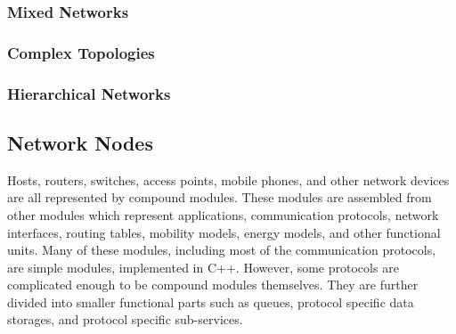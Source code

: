 
\subsubsection*{Mixed Networks}


\subsubsection*{Complex Topologies}


\subsubsection*{Hierarchical Networks}


\subsection{Network Nodes}
\label{subsec:network-nodes}



Hosts, routers, switches, access points, mobile phones, and other network devices are all represented by \omnet compound modules. These modules are assembled from other modules which represent applications, communication protocols, network interfaces, routing tables, mobility models, energy models, and other functional units. Many of these modules, including most of the communication protocols, are simple modules, implemented in C++. However, some protocols are complicated enough to be compound modules themselves. They are further divided into smaller functional parts such as queues, protocol specific data storages, and protocol specific sub-services.

